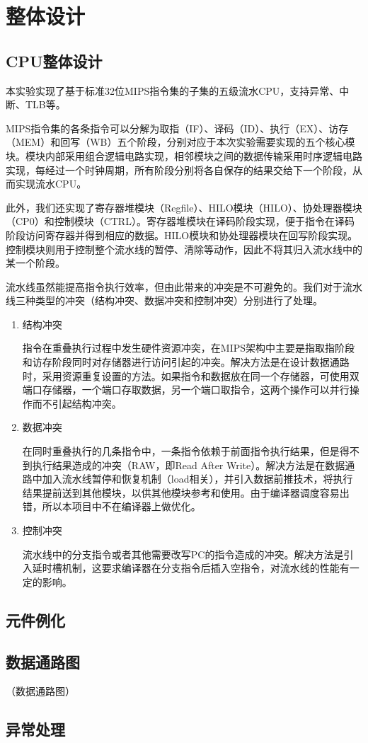 \section{整体设计}
\subsection{CPU整体设计}
本实验实现了基于标准32位MIPS指令集的子集的五级流水CPU，支持异常、中断、TLB等。

MIPS指令集的各条指令可以分解为取指（IF）、译码（ID）、执行（EX）、访存（MEM）和回写（WB）五个阶段，分别对应于本次实验需要实现的五个核心模块。模块内部采用组合逻辑电路实现，相邻模块之间的数据传输采用时序逻辑电路实现，每经过一个时钟周期，所有阶段分别将各自保存的结果交给下一个阶段，从而实现流水CPU。

此外，我们还实现了寄存器堆模块（Regfile）、HILO模块（HILO）、协处理器模块（CP0）和控制模块（CTRL）。寄存器堆模块在译码阶段实现，便于指令在译码阶段访问寄存器并得到相应的数据。HILO模块和协处理器模块在回写阶段实现。控制模块则用于控制整个流水线的暂停、清除等动作，因此不将其归入流水线中的某一个阶段。

流水线虽然能提高指令执行效率，但由此带来的冲突是不可避免的。我们对于流水线三种类型的冲突（结构冲突、数据冲突和控制冲突）分别进行了处理。
\begin{enumerate}
	\item 结构冲突
	
	指令在重叠执行过程中发生硬件资源冲突，在MIPS架构中主要是指取指阶段和访存阶段同时对存储器进行访问引起的冲突。解决方法是在设计数据通路时，采用资源重复设置的方法。如果指令和数据放在同一个存储器，可使用双端口存储器，一个端口存取数据，另一个端口取指令，这两个操作可以并行操作而不引起结构冲突。
	
	\item 数据冲突
	
	在同时重叠执行的几条指令中，一条指令依赖于前面指令执行结果，但是得不到执行结果造成的冲突（RAW，即Read After Write）。解决方法是在数据通路中加入流水线暂停和恢复机制（load相关），并引入数据前推技术，将执行结果提前送到其他模块，以供其他模块参考和使用。由于编译器调度容易出错，所以本项目中不在编译器上做优化。
	
	\item 控制冲突
	
	流水线中的分支指令或者其他需要改写PC的指令造成的冲突。解决方法是引入延时槽机制，这要求编译器在分支指令后插入空指令，对流水线的性能有一定的影响。
	
\end{enumerate}
\subsection{元件例化}
\subsection{数据通路图}
（数据通路图）
\subsection{异常处理}